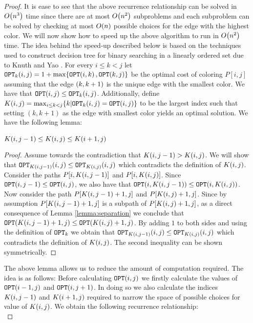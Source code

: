 \begin{proof}
It is ease to see that the above recurrence relationship can be solved in $O\br{n^3}$ time since there are at most $O\br{n^2}$ subproblems and each subproblem can be solved by checking at most $O\br{n}$ possible choices for the edge with the highest color. We will now show how to speed up the above algorithm to run in $O\br{n^2}$ time. The idea behind the speed-up described below is based on the techniques used to construct decision tree for binary searching in a linearly ordered set due to Knuth \cite{Knuth1973} and Yao \cite{EffDPusingQI}. For every $i\leq k< j$ let $\OPT_k\br{i,j} = 1 + \max\brc{\OPT\br{i, k}, \OPT\br{k, j}}$ be the optimal cost of coloring $P[i,j]$ assuming that the edge $\br{k, k+1}$ is the unique edge with the smallest color. We have that $\OPT\br{i,j}\leq \OPT_k\br{i,j}$. Additionally, define 
$K\br{i,j} = \max_{i\leq k< j}\brc{k|\OPT_k\br{i,j}=\OPT\br{i,j}}$ to be the largest index such that setting $(k,k+1)$ as the edge with smallest color yields an optimal solution. We have the following lemma:
\begin{lemma}
   $K\br{i,j-1}\leq K\br{i,j}\leq K\br{i +1,j}$
\end{lemma}
\begin{proof}
   Assume towards the contradiction that $K\br{i,j-1}> K\br{i,j}$. We will show that $\OPT_{K\br{i,j-1}}\br{i, j} \leq \OPT_{K\br{i,j}}\br{i, j}$ which contradicts the definition of $K\br{i,j}$. Consider the paths $P[i,K\br{i,j-1}]$ and $P[i,K\br{i,j}]$. Since $\OPT\br{i, j-1} \leq \OPT\br{i, j}$, we also have that $\OPT\br{i, K\br{i,j-1}} \leq \OPT\br{i, K\br{i,j}}$. Now consider the path $P[K\br{i,j-1}+1, j]$ and $P[K\br{i,j}+1, j]$. Since by assumption $P[K\br{i,j-1}+1, j]$ is a subpath of $P[K\br{i,j}+1, j]$, as a direct consequence of Lemma \ref{lemma:separation} we conclude that $\OPT\br{K\br{i,j-1}+1, j} \leq \OPT\br{K\br{i,j}+1, j}$. By adding $1$ to both sides and using the definition of $\OPT_k$ we obtain that $\OPT_{K\br{i,j-1}}\br{i, j} \leq \OPT_{K\br{i,j}}\br{i, j}$ which contradicts the definition of $K\br{i,j}$. The second inequality can be shown symmetrically.
   \end{proof} 
The above lemma allows us to reduce the amount of computation required. The idea is as follows: Before calculating $\OPT\br{i,j}$ we firstly calculate the values of $\OPT\br{i -1,j}$ and $\OPT\br{i,j + 1}$. In doing so we also calculate the indices $K\br{i,j-1}$ and $K\br{i +1,j}$ required to narrow the space of possible choices for value of $K\br{i,j}$. We obtain the following recurrence relationship:
$$
$$
\end{proof}

